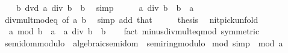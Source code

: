 \begin{isabellebody}
\ \ \isamarkupfalse%
\ {\isachardoublequoteopen}b\ dvd\ {\isacharparenleft}{\kern0pt}a\ div\ b{\isacharparenright}{\kern0pt}\ {\isacharasterisk}{\kern0pt}\ b{\isachardoublequoteclose}\ \isamarkupfalse%
\ simp\isanewline
\ \ \isamarkupfalse%
\ \isamarkupfalse%
\ {\isachardoublequoteopen}{\isacharparenleft}{\kern0pt}a\ div\ b{\isacharparenright}{\kern0pt}\ {\isacharasterisk}{\kern0pt}\ b\ {\isacharequal}{\kern0pt}\ a{\isachardoublequoteclose}\isanewline
\ \ \ \ \isamarkupfalse%
\ div{\isacharunderscore}{\kern0pt}mult{\isacharunderscore}{\kern0pt}mod{\isacharunderscore}{\kern0pt}eq\ {\isacharbrackleft}{\kern0pt}of\ a\ b{\isacharbrackright}{\kern0pt}\ \isamarkupfalse%
\ {\isacharparenleft}{\kern0pt}simp\ add{\isacharcolon}{\kern0pt}\ that{\isacharparenright}{\kern0pt}\isanewline
\ \ \isamarkupfalse%
\ \isamarkupfalse%
\ {\isacharquery}{\kern0pt}thesis\ \isacommand{{\isachardot}{\kern0pt}}\isamarkupfalse%
\isanewline
{}\isamarkupfalse%
%
\endisatagproof
{\isafoldproof}%
%
\isadelimproof
\isanewline
%
\endisadelimproof
\isanewline
{}\isamarkupfalse%
\ {\isacharbrackleft}{\kern0pt}nitpick{\isacharunderscore}{\kern0pt}unfold{\isacharbrackright}{\kern0pt}{\isacharcolon}{\kern0pt}\isanewline
\ \ {\isachardoublequoteopen}a\ mod\ b\ {\isacharequal}{\kern0pt}\ a\ {\isacharminus}{\kern0pt}\ a\ div\ b\ {\isacharasterisk}{\kern0pt}\ b{\isachardoublequoteclose}\isanewline
%
\isadelimproof
\ \ %
\endisadelimproof
%
\isatagproof
{}\isamarkupfalse%
\ {\isacharparenleft}{\kern0pt}fact\ minus{\isacharunderscore}{\kern0pt}div{\isacharunderscore}{\kern0pt}mult{\isacharunderscore}{\kern0pt}eq{\isacharunderscore}{\kern0pt}mod\ {\isacharbrackleft}{\kern0pt}symmetric{\isacharbrackright}{\kern0pt}{\isacharparenright}{\kern0pt}%
\endisatagproof
{\isafoldproof}%
%
\isadelimproof
\isanewline
%
\endisadelimproof
\isanewline
{}\isamarkupfalse%
%
\isadelimdocument
%
\endisadelimdocument
%
\isatagdocument
%
\isamarkuptrue%
%
\endisatagdocument
{\isafolddocument}%
%
\isadelimdocument
%
\endisadelimdocument
{}\isamarkupfalse%
\ semidom{\isacharunderscore}{\kern0pt}modulo\ {\isacharequal}{\kern0pt}\ algebraic{\isacharunderscore}{\kern0pt}semidom\ {\isacharplus}{\kern0pt}\ semiring{\isacharunderscore}{\kern0pt}modulo\isanewline
{}\isanewline
\isanewline
{}\isamarkupfalse%
\ mod{\isacharunderscore}{\kern0pt}{}\ {\isacharbrackleft}{\kern0pt}simp{\isacharbrackright}{\kern0pt}{\isacharcolon}{\kern0pt}\ {\isachardoublequoteopen}{}\ mod\ a\ {\isacharequal}{\kern0pt}\ {}{\isachardoublequoteclose}\isanewline

\end{isabellebody}
